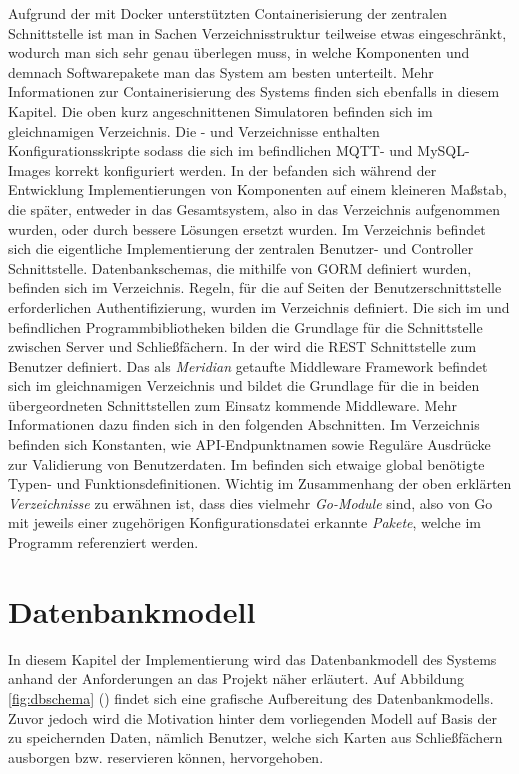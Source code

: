 Aufgrund der mit Docker unterstützten Containerisierung der zentralen Schnittstelle ist man in Sachen Verzeichnisstruktur teilweise etwas eingeschränkt, wodurch man sich sehr genau überlegen muss, in welche Komponenten und demnach Softwarepakete man das System am besten unterteilt. Mehr Informationen zur Containerisierung des Systems finden sich ebenfalls in diesem Kapitel. Die oben kurz angeschnittenen Simulatoren befinden sich im gleichnamigen  Verzeichnis. Die - und  Verzeichnisse enthalten Konfigurationsskripte sodass die sich im  befindlichen MQTT- und MySQL-Images korrekt konfiguriert werden. In der  befanden sich während der Entwicklung Implementierungen von Komponenten auf einem kleineren Maßstab, die später, entweder in das Gesamtsystem, also in das  Verzeichnis aufgenommen wurden, oder durch bessere Lösungen ersetzt wurden. Im  Verzeichnis befindet sich die eigentliche Implementierung der zentralen Benutzer- und Controller Schnittstelle. Datenbankschemas, die mithilfe von GORM definiert wurden, befinden sich im  Verzeichnis. Regeln, für die auf Seiten der Benutzerschnittstelle erforderlichen Authentifizierung, wurden im  Verzeichnis definiert. Die sich im  und  befindlichen Programmbibliotheken bilden die Grundlage für die Schnittstelle zwischen Server und Schließfächern. In der  wird die REST Schnittstelle zum Benutzer definiert. Das als \textit{Meridian} getaufte Middleware Framework befindet sich im gleichnamigen Verzeichnis und bildet die Grundlage für die in beiden übergeordneten Schnittstellen zum Einsatz kommende Middleware. Mehr Informationen dazu finden sich in den folgenden Abschnitten. Im  Verzeichnis befinden sich Konstanten, wie API-Endpunktnamen sowie Reguläre Ausdrücke zur Validierung von Benutzerdaten. Im  befinden sich etwaige global benötigte Typen- und Funktionsdefinitionen. %
Wichtig im Zusammenhang der oben erklärten \textit{Verzeichnisse} zu erwähnen ist, dass dies vielmehr \textit{Go-Module} sind, also von Go mit jeweils einer zugehörigen  Konfigurationsdatei erkannte \textit{Pakete}, welche im Programm referenziert werden. 

\section{Datenbankmodell}\label{sec:impl:database}
In diesem Kapitel der Implementierung wird das Datenbankmodell des Systems anhand der Anforderungen an das Projekt näher erläutert. Auf Abbildung \ref{fig:dbschema} () findet sich eine grafische Aufbereitung des Datenbankmodells. Zuvor jedoch wird die Motivation hinter dem vorliegenden Modell auf Basis der zu speichernden Daten, nämlich Benutzer, welche sich Karten aus Schließfächern ausborgen bzw. reservieren können, hervorgehoben.\bigskip

